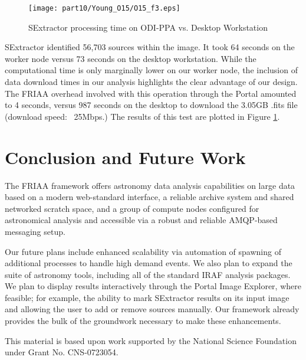 \begin{figure}[ht]
\texttt{[image: part10/Young\_O15/O15\_f3.eps]}
\caption{SExtractor processing time on ODI-PPA vs. Desktop Workstation}
\label{fig:sex_run}
\end{figure}

SExtractor identified 56,703 sources within the image. It took 64 seconds on the worker node versus 73 seconds on the desktop workstation.  While the computational time is only marginally lower on our worker node, the inclusion of data download times in our analysis highlights the clear advantage of our design.  The FRIAA overhead involved with this operation through the Portal amounted to 4 seconds, versus 987 seconds on the desktop to download the 3.05GB .fits file (download speed: ~25Mbps.)  The results of this test are plotted in Figure \ref{fig:sex_run}.

\section{Conclusion and Future Work}

The FRIAA framework offers astronomy data analysis capabilities on large data based on a modern web-standard interface, a reliable archive system and shared networked scratch space, and a group of compute nodes configured for astronomical analysis and accessible via a robust and reliable AMQP-based messaging setup. 

Our future plans include enhanced scalability via automation of spawning of additional processes to handle high demand events.  We also plan to expand the suite of astronomy tools, including all of the standard IRAF analysis packages.  We plan to display results interactively through the Portal Image Explorer, where feasible; for example, the ability to mark SExtractor results on its input image and allowing the user to add or remove sources manually.  Our framework already provides the bulk of the groundwork necessary to make these enhancements.  

 
\acknowledgements 
This material is based upon work supported by the National Science Foundation under Grant No. CNS-0723054.  


  

